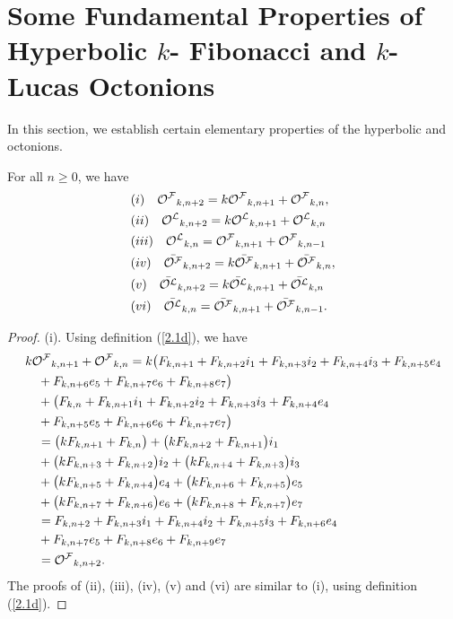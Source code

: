 \section{Some Fundamental Properties of Hyperbolic $k$- Fibonacci and $k$- Lucas Octonions}
In this section, we establish certain elementary  properties of the hyperbolic \kF\vspace{.5mm} and \kL\vspace{.5mm} octonions.
\begin{theorem} For all $n\geq{0}$, we have
\begin{align*} 
&(i)\quad {{\mathcal{O^F}}}_{k,n+2}=k{{\mathcal{O^F}}}_{k,n+1}+{{\mathcal{O^F}}}_{k,n},\\
&(ii)\quad{{\mathcal{O^L}}}_{k,n+2}=k{{\mathcal{O^L}}}_{k,n+1}+{{\mathcal{O^L}}}_{k,n}\\
&(iii)\quad{{\mathcal{O^L}}}_{k,n}={{\mathcal{O^F}}}_{k,n+1}+{{\mathcal{O^F}}}_{k,n-1}\\
&(iv)\quad \bar{{{\mathcal{O^F}}}}_{k,n+2}=k\bar{{{\mathcal{O^F}}}}_{k,n+1}+\bar{{{\mathcal{O^F}}}}_{k,n},\\
&(v)\quad\bar{{{\mathcal{O^L}}}}_{k,n+2}=k\bar{{{\mathcal{O^L}}}}_{k,n+1}+\bar{{{\mathcal{O^L}}}}_{k,n}\\
&(vi)\quad\bar{{{\mathcal{O^L}}}}_{k,n}=\bar{{{\mathcal{O^F}}}}_{k,n+1}+\bar{{{\mathcal{O^F}}}}_{k,n-1}.
\end{align*}
\end{theorem}
\begin{proof}
(i). Using definition (\ref{2.1d}), we have
\begin{align*} 
&k{{\mathcal{O^F}}}_{k,n+1}+{{\mathcal{O^F}}}_{k,n}=k\big(F_{k,n+1}+F_{k,n+2}i_1+F_{k,n+3}i_2+F_{k,n+4}i_3+F_{k,n+5}e_4\\&\quad +F_{k,n+6}e_5+F_{k,n+7}e_6+F_{k,n+8}e_7\big)\\
&\quad +\big(F_{k,n}+F_{k,n+1}i_1+F_{k,n+2}i_2+F_{k,n+3}i_3+F_{k,n+4}e_4\\&\quad +F_{k,n+5}e_5+F_{k,n+6}e_6+F_{k,n+7}e_7\big)\\
&\quad =\big(kF_{k,n+1}+F_{k,n}\big)+\big(kF_{k,n+2}+F_{k,n+1}\big)i_1\\&\quad +\big(kF_{k,n+3}+F_{k,n+2}\big)i_2+\big(kF_{k,n+4}+F_{k,n+3}\big)i_3\\&\quad +\big(kF_{k,n+5}+F_{k,n+4}\big)e_4+\big(kF_{k,n+6}+F_{k,n+5}\big)e_5\\&\quad +\big(kF_{k,n+7}+F_{k,n+6}\big)e_6+\big(kF_{k,n+8}+F_{k,n+7}\big)e_7\\
&\quad =F_{k,n+2}+F_{k,n+3}i_1+F_{k,n+4}i_2+F_{k,n+5}i_3+F_{k,n+6}e_4\\&\quad +F_{k,n+7}e_5+F_{k,n+8}e_6+F_{k,n+9}e_7\\
&\quad ={{\mathcal{O^F}}}_{k,n+2}.
\end{align*}
The proofs of (ii), (iii), (iv), (v) and (vi) are similar to (i), using definition (\ref{2.1d}).
\end{proof}
